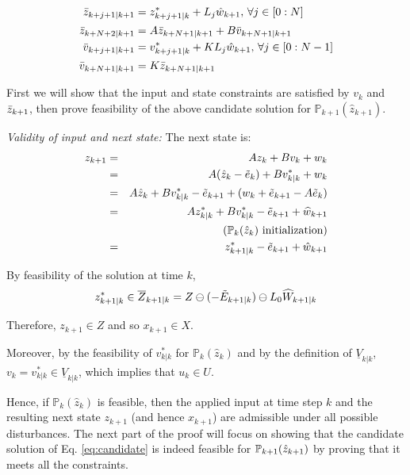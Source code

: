 \begin{subequations}
\begin{align}
\label{eq:candidate}
\bar{z}_{k+j+1|k+1} &= z^{*}_{k+j+1|k} + L_j\hat{w}_{k+1}, \, \forall j \in [0:N]\\
\bar{z}_{k+N+2|k+1}&= A\bar{z}_{k+N+1|k+1} + B\bar{v}_{k+N+1|k+1} \\
\bar{v}_{k+j+1|k+1}&=v^{*}_{k+j+1|k} + KL_j\hat{w}_{k+1}, \, \forall j \in [0:N-1]\\
\bar{v}_{k+N+1|k+1}&=K\bar{z}_{k+N+1|k+1} 
\end{align}
\end{subequations}

First we will show that the input and state constraints are satisfied by $v_k$ and $\bar{z}_{k+1}$, then prove feasibility of the above candidate solution for $\mathbb{P}_{k+1}(\hat{z}_{k+1})$.

\textit{Validity of input and next state:}
The next state is:
\begin{eqnarray}
\label{eq:z_next}
z_{k+1} &= &Az_k + Bv_k + w_k \nonumber
\\
&=& A(\hat{z}_k-\tilde{e}_k)+Bv^{*}_{k|k}+w_k \nonumber \\
 &=& A\hat{z}_k+Bv^{*}_{k|k}-\tilde{e}_{k+1}+(w_k+\tilde{e}_{k+1}-A\tilde{e}_k) \nonumber \\
  &=& Az^{*}_{k|k} +Bv^{*}_{k|k}-\tilde{e}_{k+1}+  \widehat{w}_{k+1} \nonumber\\
  & \;& \quad (\mathbb{P}_{k}(\hat{z}_{k}) \text{ initialization}) \nonumber \\
&= &z^{*}_{k+1|k} - \tilde{e}_{k+1} + \hat{w}_{k+1} 
\end{eqnarray}

By feasibility of the solution at time $k$,
\begin{equation*}
z^{*}_{k+1|k} \in\overline{Z}_{k+1|k} = Z \ominus (-\tilde{E}_{k+1|k}) \ominus L_0\widehat{W}_{k+1|k}
\end{equation*}

Therefore, $z_{k+1} \in Z$ and so $x_{k+1} \in X$.

Moreover, by the feasibility of $v^{*}_{k|k}$ for $\mathbb{P}_{k}(\hat{z}_k)$ and by the definition of $\underline{V}_{k|k}$,
$v_k = v^{*}_{k|k} \in \underline{V}_{k|k}$, which implies that $u_k \in U$.

Hence, if $\mathbb{P}_{k}(\hat{z}_k)$ is feasible, then the applied input at time step $k$ and the resulting next state $z_{k+1}$ (and hence $x_{k+1}$) are admissible under all possible disturbances. 
The next part of the proof will focus on showing that the candidate solution of Eq. \eqref{eq:candidate} is indeed feasible for $\mathbb{P}_{k+1}(\hat{z}_{k+1})$ by proving that it meets all the constraints.

